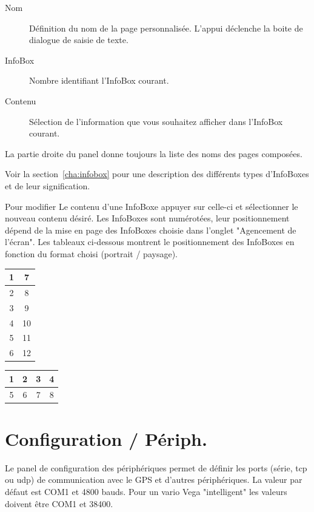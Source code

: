 \begin{description}
\item[Nom]  Définition du nom de la page personnalisée. L'appui déclenche la boite de dialogue de saisie de texte.
\item[InfoBox]  Nombre identifiant l'InfoBox courant.
\item[Contenu]  Sélection de l'information que vous souhaitez afficher dans l'InfoBox courant.
\end{description}

La partie droite du panel donne toujours la liste des noms des pages composées. 

Voir la section~\ref{cha:infobox} pour une description des différents types d'InfoBoxes et de leur signification.

Pour modifier Le contenu d'une InfoBoxe appuyer sur celle-ci et sélectionner le nouveau contenu désiré. Les InfoBoxes sont numérotées, leur positionnement dépend de la mise en page des InfoBoxes choisie dans l'onglet "Agencement de l'écran". Les tableaux ci-dessous montrent le positionnement des InfoBoxes en fonction du format choisi (portrait / paysage).


\begin{multicols}{2}
\begin{tabular}{|c|c|}
\hline
1 & 7 \\
\hline
2 & 8 \\
\hline
3 & 9 \\
\hline
4 & 10 \\
\hline
5 & 11 \\
\hline
6 & 12 \\
\hline
\end{tabular}

\begin{tabular}{|c|c|c|c|}
\hline
1 & 2 & 3 & 4 \\
\hline
\hline
5 & 6 & 7 & 8 \\
\hline
\end{tabular}
\end{multicols}

\section{Configuration / Périph.} \label{conf:comdevices}

Le panel de configuration des périphériques permet de définir les ports (série, tcp ou udp) de communication avec le GPS et d'autres périphériques. La valeur par défaut est COM1 et 4800 bauds. Pour un vario Vega "intelligent" les valeurs doivent être COM1 et 38400.

